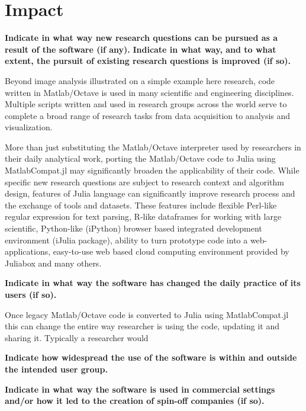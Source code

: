 \section{Impact}
\label{Impact} 

\textbf{Indicate in what way new research questions can be pursued as a result of the software (if any).}
\textbf{Indicate in what way, and to what extent, the pursuit of existing research questions is improved (if so).}

Beyond image analysis illustrated on a simple example here research, code written in Matlab/Octave is used in many scientific and engineering disciplines. Multiple scripts written and used in research groups across the world serve to complete a broad range of research tasks from data acquisition to analysis and visualization.

More than just substituting the Matlab/Octave interpreter used by researchers in their daily analytical work, porting the Matlab/Octave code to Julia using MatlabCompat.jl may significantly broaden the applicability of their code. While specific new research questions are subject to research context and algorithm design, features of Julia language can significantly improve research process and the exchange of tools and datasets. These features include flexible Perl-like regular expression for text parsing, R-like dataframes for working with large scientific, Python-like (iPython) browser based integrated development environment (iJulia package), ability to turn prototype code into a web-applications, easy-to-use web based cloud computing environment provided by Juliabox and many others.

\textbf{Indicate in what way the software has changed the daily practice of its users (if so).}

Once legacy Matlab/Octave code is converted to Julia using MatlabCompat.jl this can change the entire way researcher is using the code, updating it and sharing it. Typically a researcher would

\textbf{Indicate how widespread the use of the software is within and outside the intended user group.}


\textbf{Indicate in what way the software is used in commercial settings and/or how it led to the creation of spin-off companies (if so).}

  
  